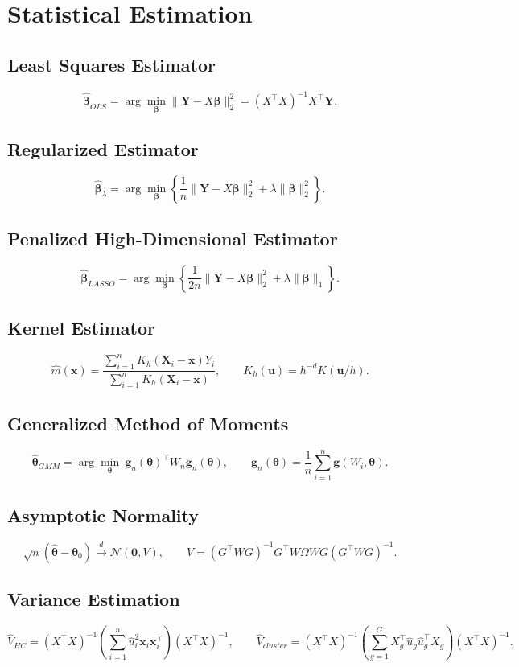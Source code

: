 \documentclass[11pt]{article}
\begin{document}
\section{Statistical Estimation}

\subsection{Least Squares Estimator}
\[
\hat{\bm{\beta}}_{OLS}=\arg\min_{\bm{\beta}}\|\bm{Y}-X\bm{\beta}\|_2^2=(X^\top X)^{-1}X^\top\bm{Y}.
\]

\subsection{Regularized Estimator}
\[
\hat{\bm{\beta}}_{\lambda}=\arg\min_{\bm{\beta}}\left\{\frac{1}{n}\|\bm{Y}-X\bm{\beta}\|_2^2+\lambda\|\bm{\beta}\|_2^2\right\}.
\]

\subsection{Penalized High-Dimensional Estimator}
\[
\hat{\bm{\beta}}_{LASSO}=\arg\min_{\bm{\beta}}\left\{\frac{1}{2n}\|\bm{Y}-X\bm{\beta}\|_2^2+\lambda\|\bm{\beta}\|_1\right\}.
\]

\subsection{Kernel Estimator}
\[
\hat m(\bm{x})=\frac{\sum_{i=1}^n K_h(\bm{X}_i-\bm{x})Y_i}{\sum_{i=1}^n K_h(\bm{X}_i-\bm{x})},
\qquad K_h(\bm{u})=h^{-d}K(\bm{u}/h).
\]

\subsection{Generalized Method of Moments}
\[
\hat{\bm{\theta}}_{GMM}=\arg\min_{\bm{\theta}}\ \bar{\bm{g}}_n(\bm{\theta})^\top W_n\bar{\bm{g}}_n(\bm{\theta}),
\qquad \bar{\bm{g}}_n(\bm{\theta})=\frac1n\sum_{i=1}^n\bm{g}(W_i,\bm{\theta}).
\]

\subsection{Asymptotic Normality}
\[
\sqrt{n}(\hat{\bm{\theta}}-\bm{\theta}_0)\xrightarrow{d}\mathcal{N}(\bm{0},V),
\qquad V=(G^\top WG)^{-1}G^\top W\Omega WG(G^\top WG)^{-1}.
\]

\subsection{Variance Estimation}
\[
\hat V_{HC}=(X^\top X)^{-1}\left(\sum_{i=1}^n \hat u_i^2\bm{x}_i\bm{x}_i^\top\right)(X^\top X)^{-1},
\qquad \hat V_{cluster}= (X^\top X)^{-1}\left(\sum_{g=1}^G X_g^\top\hat u_g\hat u_g^\top X_g\right)(X^\top X)^{-1}.
\]
\end{document}
